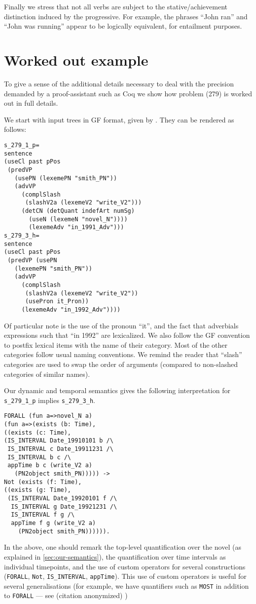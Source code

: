 \documentclass[a4paper,twoside]{article}
\begin{document}
Finally we stress that not all verbs are subject to the
stative/achievement distinction induced by the progressive. For
example, the phrases ``John ran'' and ``John was running'' appear to
be logically equivalent, for entailment purposes.


\section{Worked out example}
To give a sense of the additional details necessary to deal with the
precision demanded by a proof-assistant such as Coq we show how
problem (279) is worked out in full details.

We start with input trees in GF format, given by
\citet{Ljunglof:2012}. They can be rendered as follows:

\begin{small}
\begin{verbatim}
s_279_1_p=
sentence
(useCl past pPos
 (predVP
   (usePN (lexemePN "smith_PN"))
   (advVP
     (complSlash
      (slashV2a (lexemeV2 "write_V2")))
     (detCN (detQuant indefArt numSg)
       (useN (lexemeN "novel_N"))))
       (lexemeAdv "in_1991_Adv")))
s_279_3_h=
sentence
(useCl past pPos
 (predVP (usePN
   (lexemePN "smith_PN"))
   (advVP
     (complSlash
      (slashV2a (lexemeV2 "write_V2"))
      (usePron it_Pron))
     (lexemeAdv "in_1992_Adv"))))
\end{verbatim}
\end{small}

Of particular note is the use of the pronoun ``it'', and the fact that
adverbials expressions such that ``in 1992'' are lexicalized.  We also
follow the GF convention to postfix lexical items with the name of
their category. Most of the other categories follow usual naming
conventions. We remind the reader that ``slash'' categories are used
to swap the order of arguments (compared to non-slashed categories of
similar names).

Our dynamic and temporal semantics gives the following interpretation
for \verb!s_279_1_p! implies \verb!s_279_3_h!.
{\small
\begin{verbatim}
FORALL (fun a=>novel_N a)
(fun a=>(exists (b: Time),
((exists (c: Time),
(IS_INTERVAL Date_19910101 b /\
 IS_INTERVAL c Date_19911231 /\
 IS_INTERVAL b c /\
 appTime b c (write_V2 a)
   (PN2object smith_PN))))) ->
Not (exists (f: Time),
((exists (g: Time),
 (IS_INTERVAL Date_19920101 f /\
  IS_INTERVAL g Date_19921231 /\
  IS_INTERVAL f g /\
  appTime f g (write_V2 a) 
    (PN2object smith_PN)))))).
\end{verbatim}
}
In the above, one should remark the top-level quantification over the
novel (as explained in \cref{sec:our-semantics}), the quantification
over time intervals as individual timepoints, and the use of custom
operators for several constructions (\verb!FORALL!, \verb!Not!, \verb!IS_INTERVAL!,
\verb!appTime!). This use of custom operators is useful for several
generalisations (for example, we have quantifiers such as \verb!MOST! in
addition to \verb!FORALL! --- see \ifanon (citation anonymized)
\else \citet{bernardy_type-theoretical_2017} \fi)
\end{document}

